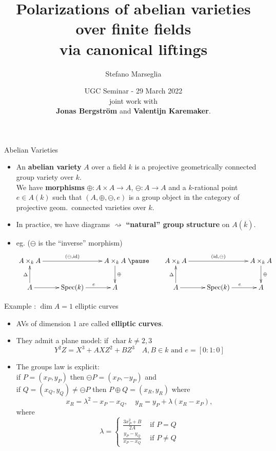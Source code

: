 \documentclass[usenames,dvipsnames]{beamer}
\title[]{Polarizations of abelian varieties over finite fields\\ via canonical liftings}
\subtitle{}
\author[Stefano Marseglia]{Stefano Marseglia\\}
\institute[]{Utrecht University}
\date[1 June 2021]{UGC Seminar - 29 March 2022\\ \pause joint work with\\ {\bf Jonas Bergstr\"om} and {\bf Valentijn Karemaker}.}
\DeclareMathOperator{\Char}{char}
\begin{document}
\begin{frame}
\titlepage
\end{frame}


\begin{frame}{ Abelian Varieties }
	\begin{itemize}
	 \item An {\bf abelian variety} $A$ over a field $k$ is a projective geometrically connected group variety over $k$.\\
	 \pause We have {\bf morphisms} $\oplus:A\times A \to A$, $\ominus:A\to A$ and a $k$-rational point $e\in A(k)$ such that $(A,\oplus,\ominus,e)$ is a group object in the category of projective geom.~connected varieties over $k$.
	 \pause \item In practice, we have {diagrams $\rightsquigarrow$} {\bf ``natural'' group structure} on $A(\overline k)$.
	 \pause \item eg. ($\ominus$ is the ``inverse'' morphism)
	 {\tiny
	 \[ 
	 	\xymatrix{
	 		A\times_k A \ar[rr]^{(\ominus,\mathrm{id})} 	& 						& A\times_k A \ar[d]^{\oplus}\\
	 		A \ar[u]^{\Delta} \ar[r] 	& \mathrm{Spec}(k) \ar[r]^{e}	& A 
	 	}
	 	\pause \qquad
	 	\xymatrix{
	 		A\times_k A \ar[rr]^{(\mathrm{id},\ominus)} 	& 						& A\times_k A \ar[d]^{\oplus}\\
	 		A \ar[u]^{\Delta} \ar[r] 	& \mathrm{Spec}(k) \ar[r]^{e}	& A 
	 	}
	  \]}
	\end{itemize}
\end{frame}

\begin{frame}{ Example : $\dim A=1$ elliptic curves  }
	\begin{itemize}
		\item AVs of dimension $1$ are called {\bf elliptic curves}.
		\pause \item They admit a {plane model}: if $\Char k \neq 2,3$
		\[  Y^2Z = X^3 +AXZ^2 + BZ^3\quad A,B \in k\text{ and }e=[0:1:0]  \]
		\pause \vspace{-0.7cm} \item The {groups law is explicit}:\\
		if $P=(x_P,y_P) $ then $ \ominus P=(x_P,-y_P) $ and\\
		\pause if $Q=(x_Q,y_Q)\neq \ominus P$ then $P\oplus Q=(x_R,y_R)$ where
		\[ x_R = \lambda^2 -x_P-x_Q, \quad y_R = y_P+\lambda (x_R-x_P), \]
		where
		\[ \lambda = 
		\begin{cases}
			\frac{3x_P^2 + B}{2A}& \text{ if } P=Q  \\
			\frac{y_P -y_Q}{x_P - x_Q} &  \text{ if } P\neq Q
		\end{cases}
		\]	
	\end{itemize}
\end{frame}
\end{document}
